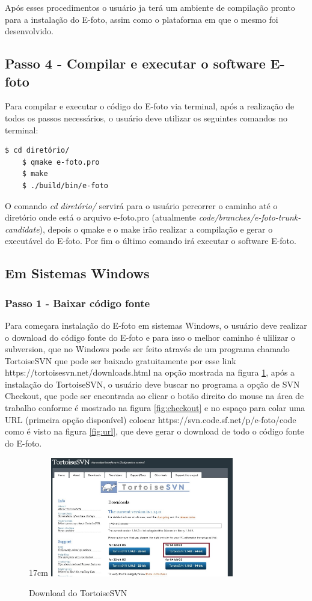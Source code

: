 Após esses procedimentos o usuário ja terá um ambiente de compilação pronto para a instalação do E-foto, assim como o plataforma em que o mesmo foi desenvolvido.
    
\subsection{Passo 4 - Compilar e executar o software E-foto}
Para compilar e executar o código do E-foto via terminal, após a realização de todos os passos necessários, o usuário deve utilizar os seguintes comandos no terminal:
\begin{lstlisting}[language=bash]
   	$ cd diretório/
   	$ qmake e-foto.pro
   	$ make
   	$ ./build/bin/e-foto
\end{lstlisting}
   
O comando \textit{cd diretório/} servirá para o usuário percorrer o caminho até o diretório onde está o arquivo e-foto.pro (atualmente \textit{code/branches/e-foto-trunk-candidate}), depois o qmake e o make irão realizar a compilação e gerar o executável do E-foto. Por fim o último comando irá executar o software E-foto.

\subsection{Em Sistemas Windows}

\subsubsection{Passo 1 - Baixar código fonte}
 Para começara instalação do E-foto em sistemas Windows, o usuário deve realizar o download do código fonte do E-foto e para isso o melhor caminho é ulilizar o subversion, que no Windows pode ser feito através de um programa chamado TortoiseSVN que pode ser baixado gratuitamente por esse link https://tortoisesvn.net/downloads.html na opção mostrada na figura \ref{fig:tortoise}, após a instalação do TortoiseSVN, o usuário deve buscar no programa a opção de SVN Checkout, que pode ser encontrada ao clicar o botão direito do mouse na área de trabalho conforme é mostrado na figura \ref{fig:checkout} e no espaço para colar uma URL (primeira opção disponível) colocar https://svn.code.sf.net/p/e-foto/code como é visto na figura \ref{fig:url}, que deve gerar o download de todo o código fonte do E-foto.
 
 \begin{figure}[!ht]{17cm}
 	\centering
 	\includegraphics[width=8cm]{Figuras/tortoise.jpg}
 	\caption{Download do TortoiseSVN} \label{fig:tortoise}
 \end{figure}

